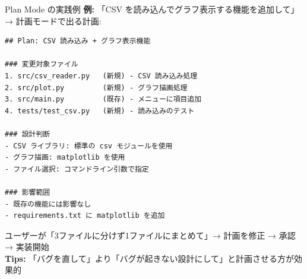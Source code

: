 \documentclass[aspectratio=169, 14pt]{beamer}
\begin{document}
\begin{frame}[fragile]{Plan Mode の実践例}
  {\small \textbf{例:} 「CSV を読み込んでグラフ表示する機能を追加して」→ 計画モードで出る計画:}

  \begin{lstlisting}[language={}, numbers=none]
## Plan: CSV 読み込み + グラフ表示機能

### 変更対象ファイル
1. src/csv_reader.py   (新規) - CSV 読み込み処理
2. src/plot.py         (新規) - グラフ描画処理
3. src/main.py         (既存) - メニューに項目追加
4. tests/test_csv.py   (新規) - 読み込みのテスト

### 設計判断
- CSV ライブラリ: 標準の csv モジュールを使用
- グラフ描画: matplotlib を使用
- ファイル選択: コマンドライン引数で指定

### 影響範囲
- 既存の機能には影響なし
- requirements.txt に matplotlib を追加
  \end{lstlisting}

  {\scriptsize
    ユーザーが「3ファイルに分けず1ファイルにまとめて」→ 計画を修正 → 承認 → 実装開始 \\
    \textbf{Tips:} 「バグを直して」より「バグが起きない設計にして」と計画させる方が効果的}
\end{frame}

\end{document}
